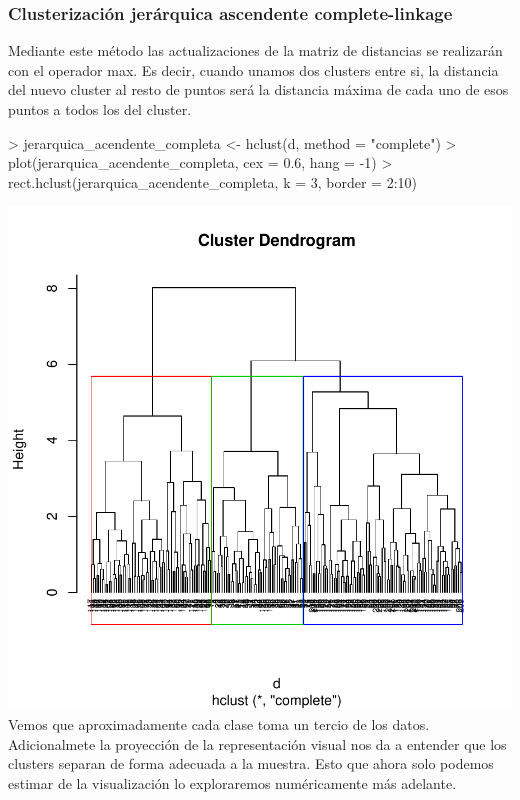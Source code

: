 \documentclass [a4paper] {article}
\begin{document}
\subsubsection{Clusterización jerárquica ascendente complete-linkage}
Mediante este método las actualizaciones de la matriz de distancias se realizarán con el operador max.
Es decir, cuando unamos dos clusters entre si, la distancia del nuevo cluster al resto de puntos será la distancia máxima de cada uno de esos puntos a todos los del cluster.
\begin{center}
\begin{Schunk}
\begin{Sinput}
> jerarquica_acendente_completa <- hclust(d, method = "complete")
> plot(jerarquica_acendente_completa, cex = 0.6, hang = -1)
> rect.hclust(jerarquica_acendente_completa, k = 3, border = 2:10)
\end{Sinput}
\end{Schunk}
\includegraphics{entrega-jerarquica_acendente_completa}
Vemos que aproximadamente cada clase toma un tercio de los datos.
Adicionalmete la proyección de la representación visual nos da a entender que los clusters separan de forma adecuada a la muestra.
Esto que ahora solo podemos estimar de la visualización lo exploraremos numéricamente más adelante.
\begin{Schunk}
\begin{Sinput}

\end{Sinput}
\end{Schunk}
\end{center}
\end{document}
